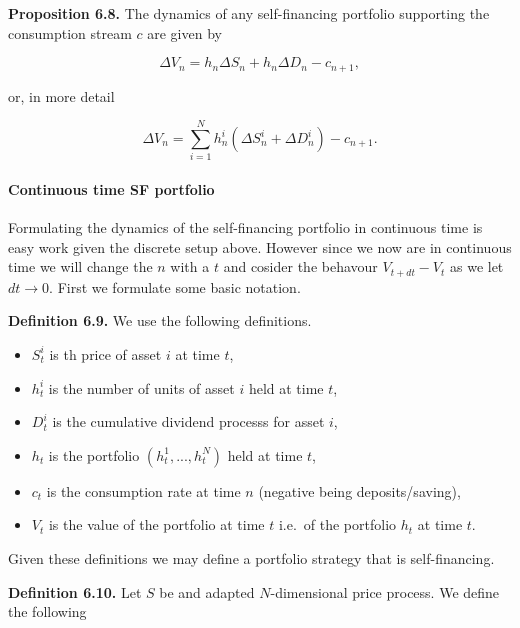 \documentclass[
]{article}
\providecommand{\tightlist}{%
  \setlength{\itemsep}{0pt}\setlength{\parskip}{0pt}}
\begin{document}
\textbf{Proposition 6.8.} The dynamics of any self-financing portfolio
supporting the consumption stream \(c\) are given by

\[
\Delta V_n=h_n \Delta S_n+h_n\Delta D_n-c_{n+1},
\]

or, in more detail

\[
\Delta V_n=\sum_{i=1}^Nh_n^i(\Delta S_n^i+\Delta D^i_n)-c_{n+1}.
\]

\hypertarget{continuous-time-sf-portfolio}{%
\paragraph{Continuous time SF
portfolio}\label{continuous-time-sf-portfolio}}

Formulating the dynamics of the self-financing portfolio in continuous
time is easy work given the discrete setup above. However since we now
are in continuous time we will change the \(n\) with a \(t\) and cosider
the behavour \(V_{t+dt}-V_t\) as we let \(dt\to 0\). First we formulate
some basic notation.

\textbf{Definition 6.9.} We use the following definitions.

\begin{itemize}
\tightlist
\item
  \(S_t^i\) is th price of asset \(i\) at time \(t\),
\item
  \(h_t^i\) is the number of units of asset \(i\) held at time \(t\),
\item
  \(D_t^i\) is the cumulative dividend processs for asset \(i\),
\item
  \(h_t\) is the portfolio \((h_t^1,...,h_t^N)\) held at time \(t\),
\item
  \(c_t\) is the consumption rate at time \(n\) (negative being
  deposits/saving),
\item
  \(V_t\) is the value of the portfolio at time \(t\) i.e.~of the
  portfolio \(h_t\) at time \(t\).
\end{itemize}

Given these definitions we may define a portfolio strategy that is
self-financing.

\textbf{Definition 6.10.} Let \(S\) be and adapted \(N\)-dimensional
price process. We define the following
\end{document}
